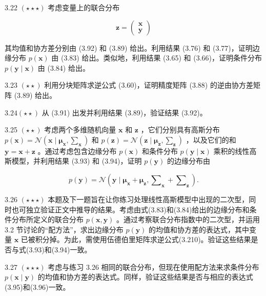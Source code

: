 \documentclass[10pt]{report}
\begin{document}
3.22 \(\left( {\star  \star   \star  }\right)\) 考虑变量上的联合分布

\[
\mathbf{z} = \left( \begin{array}{l} \mathbf{x} \\  \mathbf{y} \end{array}\right)  \tag{3.211}
\]

其均值和协方差分别由 (3.92) 和 (3.89) 给出。利用结果 (3.76) 和 (3.77)，证明边缘分布 \(p\left( \mathbf{x}\right)\) 由 (3.83) 给出。类似地，利用结果 (3.65) 和 (3.66)，证明条件分布 \(p\left( {\mathbf{y} \mid  \mathbf{x}}\right)\) 由 (3.84) 给出。

3.23 \(\left( {\star  \star  }\right)\) 利用分块矩阵求逆公式 (3.60)，证明精度矩阵 (3.88) 的逆由协方差矩阵 (3.89) 给出。

\({3.24}\left( {\star  \star  }\right)\) 从 (3.91) 出发并利用结果 (3.89)，验证结果 (3.92)。

3.25 \(\left( {\star  \star  }\right)\) 考虑两个多维随机向量 \(\mathbf{x}\) 和 \(\mathbf{z}\) ，它们分别具有高斯分布 \(p\left( \mathbf{x}\right)  = \mathcal{N}\left( {\mathbf{x} \mid  {\mathbf{\mu }}_{\mathbf{x}},{\mathbf{\sum }}_{\mathbf{x}}}\right)\) 和 \(p\left( \mathbf{z}\right)  = \mathcal{N}\left( {\mathbf{z} \mid  {\mathbf{\mu }}_{\mathbf{z}},{\mathbf{\sum }}_{\mathbf{z}}}\right)\) ，以及它们的和 \(\mathbf{y} = \mathbf{x} + \mathbf{z}\) 。通过考虑包含边缘分布 \(p\left( \mathbf{x}\right)\) 和条件分布 \(p\left( {\mathbf{y} \mid  \mathbf{x}}\right)\) 乘积的线性高斯模型，并利用结果 (3.93) 和 (3.94)，证明 \(p\left( \mathbf{y}\right)\) 的边缘分布由

\[
p\left( \mathbf{y}\right)  = \mathcal{N}\left( {\mathbf{y} \mid  {\mathbf{\mu }}_{\mathbf{x}} + {\mathbf{\mu }}_{\mathbf{z}},{\mathbf{\sum }}_{\mathbf{x}} + {\mathbf{\sum }}_{\mathbf{z}}}\right) . \tag{3.212}
\]

3.26 \(\left( {\star  \star   \star  }\right)\) 本题及下一题旨在让你练习处理线性高斯模型中出现的二次型，同时也可独立验证正文中推导的结果。考虑由式(3.83)和(3.84)给出的边缘分布和条件分布所定义的联合分布 \(p\left( {\mathbf{x},\mathbf{y}}\right)\) 。通过考察联合分布指数中的二次型，并运用 3.2 节讨论的“配方法”，求出边缘分布 \(p\left( \mathbf{y}\right)\) 的均值和协方差的表达式，其中变量 \(\mathbf{x}\) 已被积分掉。为此，需使用伍德伯里矩阵求逆公式(3.210)。验证这些结果是否与式(3.93)和(3.94)一致。

3.27 \(\left( {\star  \star   \star  }\right)\) 考虑与练习 3.26 相同的联合分布，但现在使用配方法来求条件分布 \(p\left( {\mathbf{x} \mid  \mathbf{y}}\right)\) 的均值和协方差的表达式。同样，验证这些结果是否与相应的表达式(3.95)和(3.96)一致。
\end{document}

